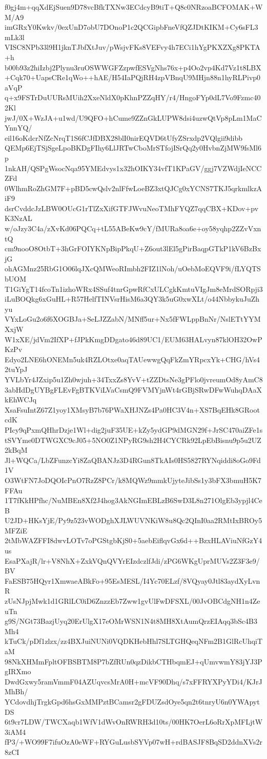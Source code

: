 f0gj4m+qqXdEjSuen9D78vcBfkTXNw3ECdcyB9tiT+Q8c0NRzoaBCFOMAK+WM/A9
imGRxY0Kwkv/0exUnD7obU7DOnoP1c2QCGipbFneVfQZJDtKIKM+Cy6sFL3mLk3l
VISC8NPb33l9H1jknTJbfXtJuv/pWsjvFKs8VEFvy4h7ECi1hYgPKXZXg8PKTA+h
b00b93z2hiIzbj2Plynu3ruOSWWGFZzpwfESVgNhs76x+p4Oo2vp4Kd7Vz1t8LBX
+Cqk70+UapsCRe1qWo++hAE/H54IaPQjRH4zpVBnqU9MHjn88n1hyRLPivp0aVqP
q+x9FSTrDuUURsMUih2XxeNldX0pKhnPZZqHY/r4/HngoFYp0dL7Vo9Fzmc402Kl
jwJ/0X+WzJA+u1wd/U9QFO+hCume9ZZnGkLUPW8dsi4uzwQtVp8pLm1MaCYnnYQ/
eil16oKdcrNfZcNrqT1S6fCJfDBX28blI0nirEQVD6tUfyZSrxdp2VQlgii9dibb
QEMp6EjTSjSgeLpoBKDgFIhy6LlJRTwCboMrSTfojISrQq2y0HvbnZjMW9fsMl6p
1nkAH/QSPgWsocNqa95YMEdvys1x32hOIKY34vfT1KPaGV/ggj7VZWdjIeNCCZFd
0WlhmRoZhGM7F+pBD5cwQslv2nlFfwLoeBZ3xtQJCg0xYCNS7TKJ5qrkmlkzAiF9
dsrCvddcJzLBW0OUcG1rTlZxXifGTFJWvuNeoTMhFYQZ7qqCBX+KDov+pvK3NzAL
w/oJzy3C4a/zXvKd06PQCq+tL55ABeKw9cY/fMURa8oa6e+oy58yqhp2ZZvVxntQ
cm9nooO8OtbT+3hGrFOIYKNpBipPkqU+Z6out3lEl5gPirBaqpGTkP1kV6BzBxjG
ohAGMnz25RbG1O06lqJXcQMWeoRImbh2FIZ1lNoh/uOebMoEQVF9i/fLYQTSbUOM
T1GiYgT14fcoTn1izhoWRx4SSuf4tnrGpwRfCxULCgkKmtuVIgJm8eMrdSORpji3
iLuBOQkg6xGuHL+R57HelfTINVsrHisM6a3QY3k5uG0xwXLt/o44NbbykuJuZhyu
VYxLoGu2o6f6XOGBJa+SeLJZZabN/MNff5ur+Nx5fFWLppBnNr/NslETtYYMXxjW
W1xXE/jdVm2IfXP+fJPkKmgDDgato46d89UC1/EUM63HALvyn87klOH32OwPKzPv
Edyo2LNE6hONEMn5uk4RZLOtxe0aqTAUewwgQqFkZmYRpcxYk+CHG/hVs42tuYpJ
YVLbYr4JZxip5u1Zh0wjuh+34TxxZs8YvV+tZZDtsNe3gPFlo0jvreumOd8yAmC8
3abHdDgUYBgFLEvFgBTKViLVaCsmQ9FVMYjnWt4rGBjSRwDFwWuhqDAaXkEhWCJq
XsaFsuIntZ67Z1yoy1XMsyB7b76PWaXHJNZs4Pa0HC3V4n+XS7BqEHk8GRootcdK
PIcy9qPxmQHhrDzje1Wl+dig2juF35UE+kZy5ydGP9dMGN29f+JrSC470aiZFe1s
tSVYme0DTWGXC9cJ05+5NO0Z1NPyRG9sh2H4CYCRk92LpEbBisnu9p5u2UZ2kBqM
Jl+WQCa/LbZFunzcYi8ZaQBANJz3D4RGun8TkAIs0HS5827RYNqiddi8oGo9Fd1V
O3WtFN7JoDQOIcPnO7RzZ8PCr/k8MQWz9mmkUjyteJibSs1y3bFX3bmuH5K7FFAu
1T7fKkHPfhc/NuMBEn8Xf2J4hog3AkNGImEBLzB6SwD3L8n271OlgEb3ypjl4CeB
U2JD+HKsYjE/Py9z523vWODghXJLWUVNKiW8u8Qc2QInI0aa2RMtIxBROy5MFZiE
2tMbWAZFFI8dwvLOTv7oPGStgbKjS0+5aebEiflqvGx6d++BzxHLAViuNfGzY4us
EsaPXajR/lr+V8NhX+ZxkVQnQVYrEIzdczlfJdi/zPG6WKgUprMUVs2Z3F3e9/BV
FaESB75HQyr1XmwaeABkFo+95EsMESL/I4Yc70ELzf/8VQyay0Jtl83aydXyLvnR
zUsNJpjMwk1d1GRlLC0iD6ZnzzEb7Zww1gvUlFwDFSXL/00JvOBCdgNH1n4ZeuTn
g9S/NGt73BazjUyq20ErUlgX17eOMrWSN1N4t8MH8XtAumQrzEIAqq3bSc4B3Mh4
kTuCk/pDf1zlzx/zz4BXJuiNUNi0VQDKHebHhl7SLTGHQeqNFm2B1GlRcUhqiTaM
98NkXHMmFpltOFBSBTM8P7bZfRUn0qzDikbCTHbqmEJ+qUmvwmY83jYJ3PgIRXmo
DwdGxwy5ramVmmF04AZUqvcsMrA0H+mcVF90Dhq/s7xFFRYXPyYDi4/KJrJMhBh/
YCdovdhjTrgkGpd6hsGxMMPztBCamsr2gFDUZsdOye5qn2t6tnryU6n0YWApytDS
6t9cr7LDW/TWCXaqb1WfV1dWvOnRWRH3d10ts/00HK7OerL6oRrXpMFLjtW3iAM4
fP3/+WO99F7ifuOzA0eWF+RYGuLusbSYVp07wH+rdBASJF8BqSD2ddnXVs2r8zCI
